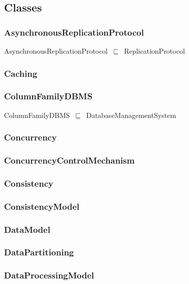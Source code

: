 \documentclass{article}
\begin{document}
\subsection*{Classes}

\subsubsection*{AsynchronousReplicationProtocol}

AsynchronousReplicationProtocol~\ensuremath{\sqsubseteq}~ReplicationProtocol~

\subsubsection*{Caching}

\subsubsection*{ColumnFamilyDBMS}

ColumnFamilyDBMS~\ensuremath{\sqsubseteq}~DatabaseManagementSystem~

\subsubsection*{Concurrency}

\subsubsection*{ConcurrencyControlMechanism}

\subsubsection*{Consistency}

\subsubsection*{ConsistencyModel}

\subsubsection*{DataModel}

\subsubsection*{DataPartitioning}

\subsubsection*{DataProcessingModel}
\end{document}
